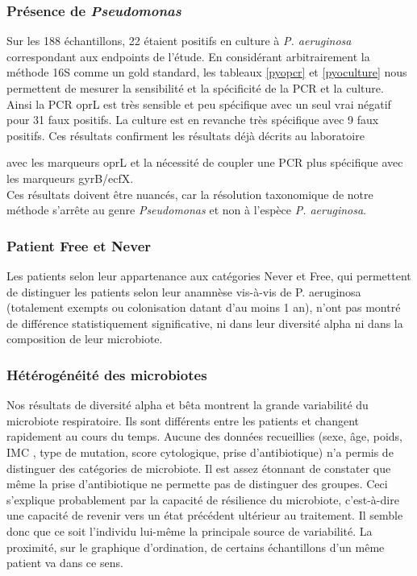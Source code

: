\documentclass[12pt,a4paper]{article}
\begin{document}
\subsubsection{Présence de \textit{Pseudomonas}}
Sur les 188 échantillons, 22 étaient positifs en culture à \textit{P. aeruginosa} correspondant aux endpoints de l'étude. En considérant arbitrairement la méthode 16S comme un gold standard, les tableaux \ref{pyopcr} et \ref{pyoculture} nous permettent de mesurer la sensibilité et la spécificité de la PCR et la culture. 
Ainsi la PCR oprL est très sensible et peu spécifique  avec un seul vrai négatif pour 31 faux positifs. 
La culture est en revanche très spécifique avec 9 faux positifs. 
Ces résultats confirment les résultats déjà décrits au laboratoire{\cite{LeGall} avec les marqueurs oprL et la nécessité de coupler une PCR plus spécifique avec les marqueurs gyrB/ecfX. \\
Ces résultats doivent être nuancés, car la résolution taxonomique de notre méthode s'arrête au genre \textit{Pseudomonas} et non à l'espèce \textit{P. aeruginosa}.

\subsubsection{Patient Free et Never}
Les patients selon leur appartenance aux catégories Never et Free\cite{Lee2003}, qui permettent de distinguer les patients selon leur anamnèse vis-à-vis de P. aeruginosa (totalement exempts ou colonisation datant d'au moins 1 an), n'ont pas montré de différence statistiquement significative, ni dans leur diversité alpha ni dans la composition de leur microbiote. 
 
\subsubsection{Hétérogénéité des microbiotes}
Nos résultats de diversité alpha et bêta montrent la grande variabilité du microbiote respiratoire. Ils sont différents entre les patients et changent rapidement au cours du temps. Aucune des données recueillies (sexe, âge, poids, IMC , type de mutation, score cytologique, prise d'antibiotique) n'a permis de distinguer des catégories de microbiote. Il est assez étonnant de constater que même la prise d'antibiotique ne permette pas de distinguer des groupes. Ceci s'explique probablement par la capacité de résilience du microbiote, c'est-à-dire une capacité de revenir vers un état précédent ultérieur au traitement. Il semble donc que ce soit l'individu lui-même la principale source de variabilité. La proximité, sur le graphique d'ordination, de certains échantillons d'un même patient va dans ce sens. 

}
\end{document}
